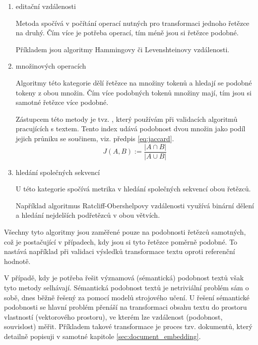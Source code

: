 \documentclass[thesis=M,czech]{FITthesis}[2019/12/23]
\begin{document}
\begin{enumerate}
    \item editační vzdálenosti
    
    Metoda spočívá v počítání operací nutných pro transformaci jednoho řetězce na druhý. Čím více je potřeba operací, tím méně jsou si řetězce podobné.
    
    Příkladem jsou algoritmy Hammingovy či Levenshteinovy vzdálenosti.

    \item množinových operacích
    
    Algoritmy této kategorie dělí řetězce na množiny tokenů a hledají se podobné tokeny z obou množin. Čím více podobných tokenů množiny mají, tím jsou si samotné řetězce více podobné.
    
    Zástupcem této metody je tvz. , který používám při validacích algoritmů pracujících s textem. Tento index udává podobnost dvou množin jako podíl jejich průniku se součinem, viz. předpis \ref{eq:jaccard}.
    \begin{equation} \label{eq:jaccard}
    J(A,B) := \frac{|A \cap B|}{|A \cup B|}
    \end{equation}
    
    \item hledání společných sekvencí
    
    U této kategorie spočívá metrika v hledání společných sekvencí obou řetězců.
    
    Například algoritmus Ratcliff-Obershelpovy vzdálenosti využívá binární dělení a hledání nejdelších podřetězců v obou větvích.
    
\end{enumerate}

Všechny tyto algoritmy jsou zaměřené pouze na podobnosti řetězců samotných, což je postačující v případech, kdy jsou si tyto řetězce poměrně podobné. To nastává například při validaci výsledků transformace textu oproti referenční hodnotě.

V případě, kdy je potřeba řešit významová (sémantická) podobnost textů však tyto metody selhávají. Sémantická podobnost textů je netriviální problém sám o sobě, dnes běžně řešený za pomocí modelů strojového učení. U řešení sémantické podobnosti se hlavní problém přenáší na transformaci obsahu textu do prostoru vlastností (vektorového prostoru), ve kterém lze vzdálenost (podobnost, souvislost) měřit. Příkladem takové transformace je proces tzv.  dokumentů, který detailně popisuji v samotné kapitole \ref{sec:document_embedding}.
\end{document}
